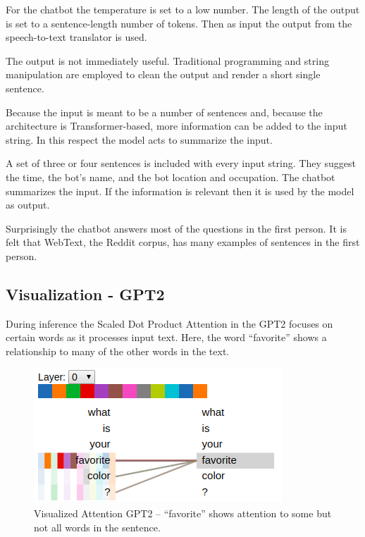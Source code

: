 
For the chatbot the temperature is set to a low number. The length of the output is set to a sentence-length number of tokens. Then as input the output from the speech-to-text translator is used.

The output is not immediately useful. Traditional programming and string manipulation are employed to clean the output and render a short single sentence. %

Because the input is meant to be a number of sentences and, because the architecture is Transformer-based, more information can be added to the input string. In this respect the model acts to summarize the input. 

A set of three or four sentences is included with every input string. They suggest the time, the bot's name, and the bot location and occupation. The chatbot summarizes the input. If the information is relevant then it is used by the model as output. %

Surprisingly the chatbot answers most of the questions in the first person. It is felt that WebText, the Reddit corpus, has many examples of sentences in the first person.

\subsection{Visualization - GPT2}

During inference the Scaled Dot Product Attention in the GPT2 focuses on certain words as it processes input text. Here, the word ``favorite'' shows a relationship to many of the other words in the text.  

\begin{figure}[H]
	\begin{center}
		\includegraphics[scale=2]{Figure_4}
		
		
	\end{center}
	\caption[Visualized Attention GPT2]{Visualized Attention GPT2 -- ``favorite'' shows attention to some but not all words in the sentence.}
	\label{diagram-vis04}
	
\end{figure}

